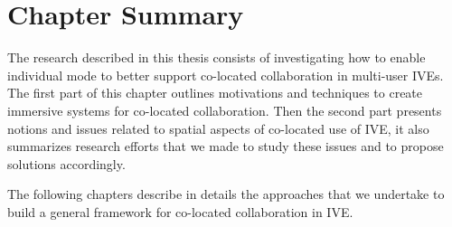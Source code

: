 \section{Chapter Summary}
The research described in this thesis consists of investigating how to enable individual mode to better support co-located collaboration in multi-user IVEs. The first part of this chapter outlines motivations and techniques to create immersive systems for co-located collaboration. Then the second part presents notions and issues related to spatial aspects of co-located use of IVE, it also summarizes research efforts that we made to study these issues and to propose solutions accordingly.

The following chapters describe in details the approaches that we undertake to build a general framework for co-located collaboration in IVE.






